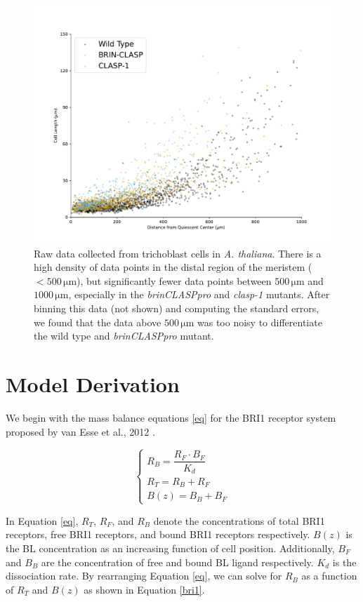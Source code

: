 \documentclass[referee,pdflatex,sn-mathphys-num]{sn-jnl}
\newcommand{\um}{\,\unit{\micro\metre}}
\begin{document}
\begin{appendices}
\begin{figure}
  \centering
  \includegraphics[width=\textwidth]{data-trichoblast.pdf}
  \caption{Raw data collected from trichoblast cells in \emph{A. thaliana}.
  There is a high density of data points in the distal region of the meristem ($< 500\um$), but significantly fewer data points between $500\um$ and $1000\um$, especially in the \emph{brinCLASPpro} and \emph{clasp-1} mutants.
After binning this data (not shown) and computing the standard errors, we found that the data above $500\um$ was too noisy to differentiate the wild type and \emph{brinCLASPpro} mutant. }
  \label{data}
\end{figure}

\section{Model Derivation}\label{secA2}

We begin with the mass balance equations \eqref{eq} for the BRI1 receptor system proposed by van Esse et al., 2012 \cite{vanesse2012}.

\begin{equation}
\begin{cases}
    \label{eq}
    R_{B} = \dfrac{R_{F} \cdot B_{F}}{K_{d}} \\
    R_{T} = R_{B} + R_{F} \\
    B(z) = B_{B} + B_{F} 
\end{cases}
\end{equation}

In Equation \ref{eq}, $R_{T}$, $R_{F}$, and $R_{B}$ denote the concentrations of total BRI1 receptors, free BRI1 receptors, and bound BRI1 receptors respectively.
$B(z)$ is the BL concentration as an increasing function of cell position.
Additionally, $B_{F}$ and $B_{B}$ are the concentration of free and bound BL ligand respectively.
$K_{d}$ is the dissociation rate.
By rearranging Equation \ref{eq}, we can solve for $R_{B}$ as a function of $R_{T}$ and $B(z)$ as shown in Equation \ref{bri1}.


\end{appendices}
\end{document}
